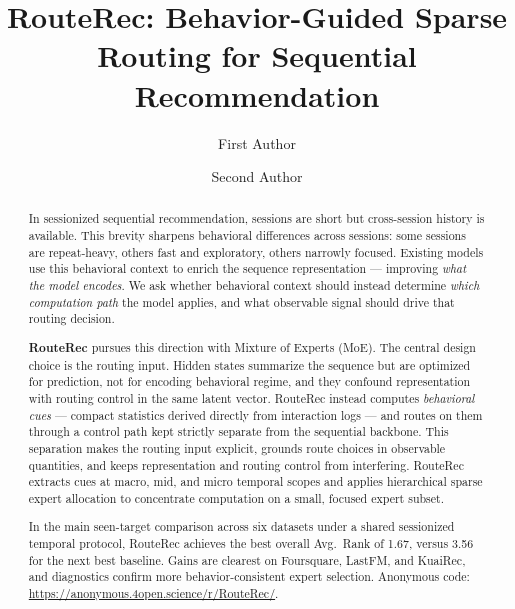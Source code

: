 \documentclass[sigconf,review,anonymous]{acmart}
\begin{document}
\title[RouteRec for Sequential Recommendation]{RouteRec: Behavior-Guided Sparse Routing for Sequential Recommendation}

\author{First Author}

\author{Second Author}

\renewcommand{\shortauthors}{Author et al.}

\begin{abstract}
In sessionized sequential recommendation, sessions are short but cross-session history is available. This brevity sharpens behavioral differences across sessions: some sessions are repeat-heavy, others fast and exploratory, others narrowly focused. Existing models use this behavioral context to enrich the sequence representation — improving \emph{what the model encodes}. We ask whether behavioral context should instead determine \emph{which computation path} the model applies, and what observable signal should drive that routing decision.

\textbf{RouteRec} pursues this direction with Mixture of Experts (MoE). The central design choice is the routing input. Hidden states summarize the sequence but are optimized for prediction, not for encoding behavioral regime, and they confound representation with routing control in the same latent vector. RouteRec instead computes \emph{behavioral cues} — compact statistics derived directly from interaction logs — and routes on them through a control path kept strictly separate from the sequential backbone. This separation makes the routing input explicit, grounds route choices in observable quantities, and keeps representation and routing control from interfering. RouteRec extracts cues at macro, mid, and micro temporal scopes and applies hierarchical sparse expert allocation to concentrate computation on a small, focused expert subset.

In the main seen-target comparison across six datasets under a shared sessionized temporal protocol, RouteRec achieves the best overall Avg.~Rank of 1.67, versus 3.56 for the next best baseline. Gains are clearest on Foursquare, LastFM, and KuaiRec, and diagnostics confirm more behavior-consistent expert selection. Anonymous code: \url{https://anonymous.4open.science/r/RouteRec/}.
\end{abstract}
\end{document}
